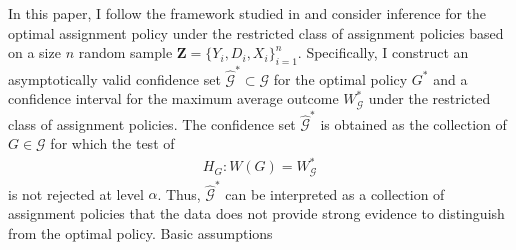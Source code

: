 \documentclass[12pt,oneside,reqno,english]{amsart}
\makeatletter
\renewcommand\subsection{\@startsection{subsection}{2}%
  \z@{-.5\linespacing\@plus-.7\linespacing}{.5\linespacing}%
  {\normalfont\scshape}}
\theoremstyle{definition}
\makeatother
\begin{document}
In this paper, I follow the framework studied in \cite{KT:18} and consider 
inference for the optimal assignment policy under the restricted class of assignment policies 
based on a size $n$ random sample $\mathbf{Z}=\{Y_{i},D_{i},X_{i}\}_{i=1}^{n}$. 
Specifically, I construct an asymptotically valid confidence set 
$\hat{\mathcal{G}}^{*}\subset \mathcal{G}$ for the optimal policy $G^{*}$ and a confidence interval for the maximum average outcome $W^{*}_{\mathcal{G}}$ under the restricted class of assignment policies.
The confidence set $\hat{\mathcal{G}}^{*}$ is obtained as 
the collection of $G\in \mathcal{G}$ for which the test of 
\begin{align}
H_{G}: W(G)=W^{*}_{\mathcal{G}}\label{eq:hypothesis1}
\end{align}
 is not rejected at level $\alpha$. 
Thus, $\hat{\mathcal{G}}^{*}$ can be interpreted as a collection of assignment policies that the data does not provide strong evidence to 
distinguish from the optimal policy.
\subsection{Basic assumptions}
\end{document}
